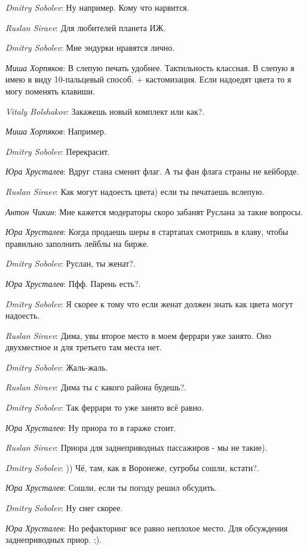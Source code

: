 \documentclass[10pt]{book}
\newcommand{\AUTHOR}[1]{\emph{#1}:}
\begin{document}
\AUTHOR{Dmitry Sobolev} Ну например. Кому что нарвится.

\AUTHOR{Ruslan Siraev} Для любителей планета ИЖ.

\AUTHOR{Dmitry Sobolev} Мне эндурки нравятся лично.

\AUTHOR{Миша Хорпяков} В слепую печать удобнее. Тактильность классная. В слепую я имею в виду 10-пальцевый способ. + кастомизация. Если надоедят цвета то я могу поменять клавиши.

\AUTHOR{Vitaly Bolshakov} Закажешь новый комплект или как?.

\AUTHOR{Миша Хорпяков} Например.

\AUTHOR{Dmitry Sobolev} Перекрасит.

\AUTHOR{Юра Хрусталев} Вдруг стана сменит флаг. А ты фан флага страны не кейборде.

\AUTHOR{Ruslan Siraev} Как могут надоесть цвета) если ты печатаешь вслепую.

\AUTHOR{Антон Чикин} Мне кажется модераторы скоро забанят Руслана за такие вопросы.

\AUTHOR{Юра Хрусталев} Когда продаешь шеры в стартапах смотришь в клаву, чтобы правильно заполнить лейблы на бирже.

\AUTHOR{Dmitry Sobolev} Руслан, ты женат?.

\AUTHOR{Юра Хрусталев} Пфф. Парень есть?.

\AUTHOR{Dmitry Sobolev} Я скорее к тому что если женат должен знать как цвета могут надоесть.

\AUTHOR{Ruslan Siraev} Дима, увы второе место в моем феррари уже занято. Оно двухместное и для третьего там места нет.

\AUTHOR{Dmitry Sobolev} Жаль-жаль.

\AUTHOR{Ruslan Siraev} Дима ты с какого района будешь?.

\AUTHOR{Dmitry Sobolev} Так феррари то уже занято всё равно.

\AUTHOR{Юра Хрусталев} Ну приора то в гараже стоит.

\AUTHOR{Ruslan Siraev} Приора для заднеприводных пассажиров - мы не такие).

\AUTHOR{Dmitry Sobolev} )) Чё, там, как в Воронеже, сугробы сошли, кстати?.

\AUTHOR{Юра Хрусталев} Сошли, если ты погоду решил обсудить.

\AUTHOR{Dmitry Sobolev} Ну снег скорее.

\AUTHOR{Юра Хрусталев} Но рефакторинг все равно неплохое место. Для обсуждения заднеприводных приор. ;).
\end{document}
